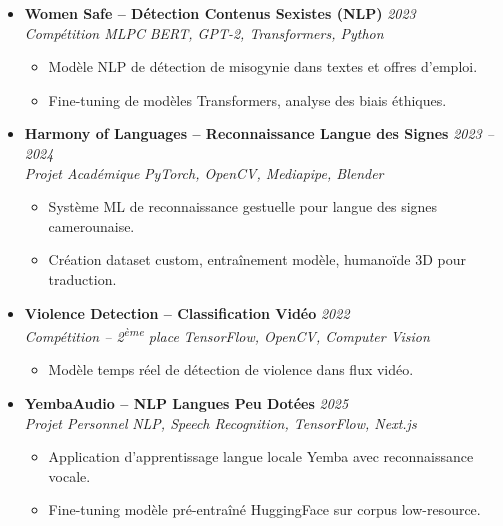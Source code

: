 \documentclass[a4paper,11pt]{article}
\begin{document}
\begin{itemize}[leftmargin=*, label={-}]
\item \textbf{Women Safe -- Détection Contenus Sexistes (NLP)} \hfill \textit{2023} \\
\textit{Compétition MLPC} \hfill \textit{BERT, GPT-2, Transformers, Python}
\vspace{-2pt}
    \begin{itemize}[leftmargin=0.4cm, nosep, label=\tiny$\bullet$]
        \item \small{Modèle NLP de détection de misogynie dans textes et offres d'emploi.}
        \item \small{Fine-tuning de modèles Transformers, analyse des biais éthiques.}
    \end{itemize}
\vspace{3pt}

\item \textbf{Harmony of Languages -- Reconnaissance Langue des Signes} \hfill \textit{2023 -- 2024} \\
\textit{Projet Académique} \hfill \textit{PyTorch, OpenCV, Mediapipe, Blender}
\vspace{-2pt}
    \begin{itemize}[leftmargin=0.4cm, nosep, label=\tiny$\bullet$]
        \item \small{Système ML de reconnaissance gestuelle pour langue des signes camerounaise.}
        \item \small{Création dataset custom, entraînement modèle, humanoïde 3D pour traduction.}
    \end{itemize}
\vspace{3pt}

\item \textbf{Violence Detection -- Classification Vidéo} \hfill \textit{2022} \\
\textit{Compétition -- 2\textsuperscript{ème} place} \hfill \textit{TensorFlow, OpenCV, Computer Vision}
\vspace{-2pt}
    \begin{itemize}[leftmargin=0.4cm, nosep, label=\tiny$\bullet$]
        \item \small{Modèle temps réel de détection de violence dans flux vidéo.}
    \end{itemize}
\vspace{3pt}

\item \textbf{YembaAudio -- NLP Langues Peu Dotées} \hfill \textit{2025} \\
\textit{Projet Personnel} \hfill \textit{NLP, Speech Recognition, TensorFlow, Next.js}
\vspace{-2pt}
    \begin{itemize}[leftmargin=0.4cm, nosep, label=\tiny$\bullet$]
        \item \small{Application d'apprentissage langue locale Yemba avec reconnaissance vocale.}
        \item \small{Fine-tuning modèle pré-entraîné HuggingFace sur corpus low-resource.}
    \end{itemize}
\vspace{3pt}

\end{itemize}
\end{document}

